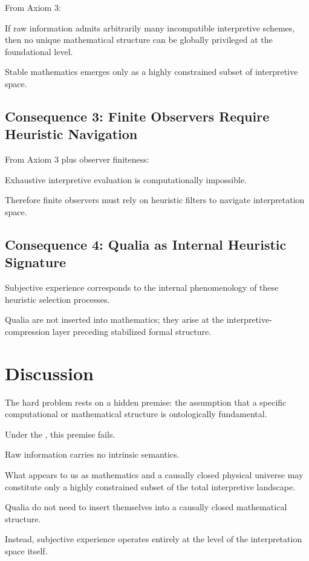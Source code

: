From Axiom 3:

If raw information admits arbitrarily many incompatible interpretive schemes, then no unique mathematical structure can be globally privileged at the foundational level.

Stable mathematics emerges only as a highly constrained subset of interpretive space.


\subsection*{Consequence 3: Finite Observers Require Heuristic Navigation}

From Axiom 3 plus observer finiteness:

Exhaustive interpretive evaluation is computationally impossible.

Therefore finite observers must rely on heuristic filters to navigate interpretation space.


\subsection*{Consequence 4: Qualia as Internal Heuristic Signature}

Subjective experience corresponds to the internal phenomenology of these heuristic selection processes.

Qualia are not inserted into mathematics;
they arise at the interpretive-compression layer preceding stabilized formal structure.




\section{Discussion}

The hard problem rests on a hidden premise: the assumption that a specific computational or mathematical structure is ontologically fundamental. 

Under the , this premise fails.

Raw information carries no intrinsic semantics.

What appears to us as mathematics and a causally closed physical universe may constitute only a highly constrained subset of the total interpretive landscape.

Qualia do not need to insert themselves into a causally closed mathematical structure.

Instead, subjective experience operates entirely at the level of the interpretation space itself.


